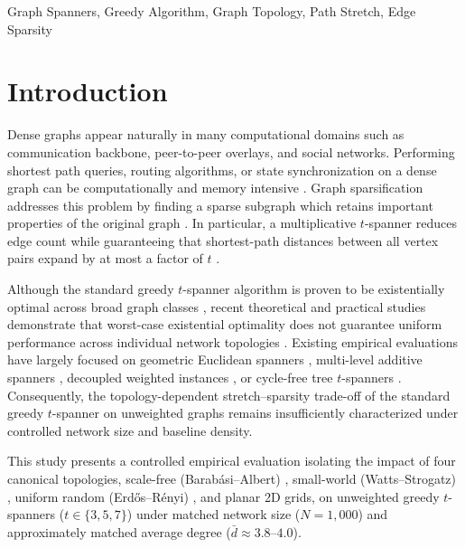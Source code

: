 \documentclass[conference]{IEEEtran}
\begin{document}
\begin{IEEEkeywords}
Graph Spanners, Greedy Algorithm, Graph Topology, Path Stretch, Edge Sparsity
\end{IEEEkeywords}



\section{Introduction}

Dense graphs appear naturally in many computational domains such as communication backbone, peer-to-peer overlays, and social networks. Performing shortest path queries, routing algorithms, or state synchronization on a dense graph can be computationally and memory intensive \cite{ref1}. Graph sparsification addresses this problem by finding a sparse subgraph which retains important properties of the original graph \cite{ref1}. In particular, a multiplicative $t$-spanner reduces edge count while guaranteeing that shortest-path distances between all vertex pairs expand by at most a factor of $t$ \cite{ref2, ref3, ref4}.

Although the standard greedy $t$-spanner algorithm \cite{ref2} is proven to be existentially optimal across broad graph classes \cite{ref5}, recent theoretical and practical studies demonstrate that worst-case existential optimality does not guarantee uniform performance across individual network topologies \cite{ref6, ref7}. Existing empirical evaluations have largely focused on geometric Euclidean spanners \cite{ref8, ref9, ref7}, multi-level additive spanners \cite{ref10}, decoupled weighted instances \cite{ref6}, or cycle-free tree $t$-spanners \cite{ref11, ref12}. Consequently, the topology-dependent stretch--sparsity trade-off of the standard greedy $t$-spanner on unweighted graphs remains insufficiently characterized under controlled network size and baseline density.

This study presents a controlled empirical evaluation isolating the impact of four canonical topologies, scale-free (Barab\'{a}si--Albert) \cite{ref13}, small-world (Watts--Strogatz) \cite{ref14}, uniform random (Erd\H{o}s--R\'{e}nyi) \cite{ref15}, and planar 2D grids, on unweighted greedy $t$-spanners ($t \in \{3, 5, 7\}$) under matched network size ($N = 1,000$) and approximately matched average degree ($\bar{d} \approx 3.8\text{--}4.0$).
\end{document}
